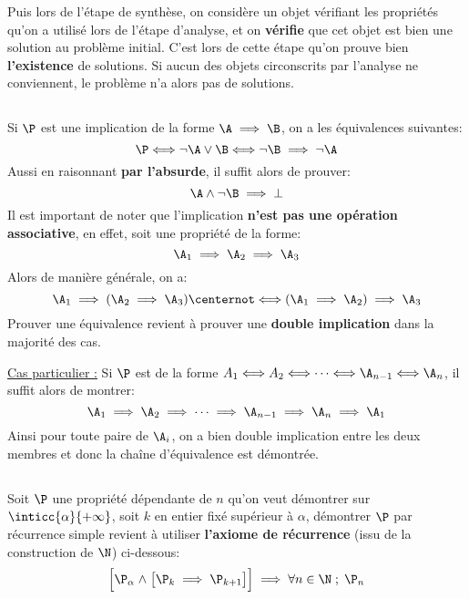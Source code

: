 Puis lors de l'étape de synthèse, on considère un objet vérifiant les propriétés qu'on a utilisé lors de l'étape d'analyse, et on \textbf{vérifie} que cet objet est bien une solution au problème initial. C'est lors de cette étape qu'on prouve bien \textbf{l'existence} de solutions. Si aucun des objets circonscrits par l'analyse ne conviennent, le problème n'a alors pas de solutions.

\subsection*{}

Si \(\P\) est une implication de la forme \(\A \implies \B\), on a les équivalences suivantes:
\[
   \P \Longleftrightarrow \lnot \A \lor \B \Longleftrightarrow \lnot \B \implies \lnot \A
\]
Aussi en raisonnant \textbf{par l'absurde}, il suffit alors de prouver:
\[
   \A \land \lnot \B \implies \bot 
\]
Il est important de noter que l'implication \textbf{n'est pas une opération associative}, en effet, soit une propriété de la forme:
\[
   \A_1 \implies \A_2 \implies \A_3
\]
Alors de manière générale, on a:
\[
   \A_1 \implies (\A_2 \implies \A_3) \centernot\Longleftrightarrow (\A_1 \implies \A_2) \implies \A_3
\]
Prouver une équivalence revient à prouver une \textbf{double implication} dans la majorité des cas.\<

\underline{Cas particulier {:}}
Si \(\P\) est de la forme \( A_1 \Longleftrightarrow A_2 \Longleftrightarrow \cdots \Longleftrightarrow \A_{n-1} \Longleftrightarrow \A_n \), il suffit alors de montrer:
\[
   \A_1 \implies \A_2 \implies \cdots \implies \A_{n-1} \implies \A_n \implies \A_1
\]
Ainsi pour toute paire de \(\A_i\), on a bien double implication entre les deux membres et donc la chaîne d'équivalence est démontrée.

\subsection*{}

Soit \(\P\) une propriété dépendante de \(n\) qu'on veut démontrer sur \(\inticc{\alpha}{+\infty}\), soit \(k\) en entier fixé supérieur à \(\alpha\), démontrer \(\P\) par récurrence simple revient à utiliser \textbf{l'axiome de récurrence} (issu de la construction de \(\N\)) ci-dessous:
\[
   \Bigr[ \P_{\alpha} \; \land \; \bigr[ \P_{k} \implies \P_{k+1} \bigr] \Bigr] \implies \forall n \in \N \; ; \; \P_n   
\]

